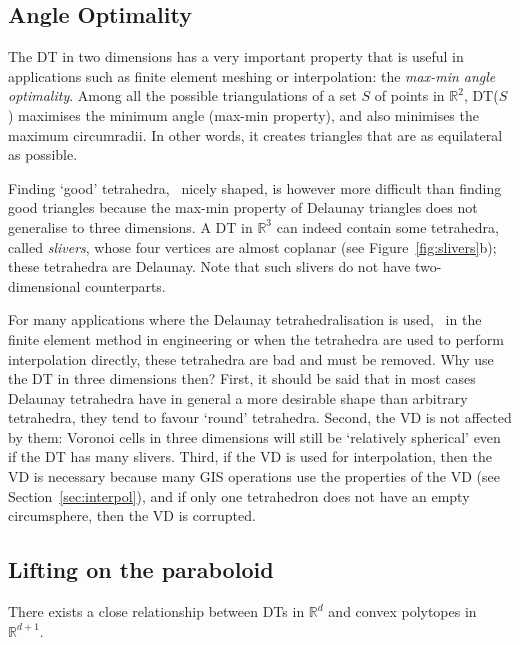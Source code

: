 \subsection{Angle Optimality}
The DT in two dimensions has a very important property that is useful in applications such as finite element meshing or interpolation: the \emph{max-min angle optimality}.
Among all the possible triangulations of a set $S$ of points in $\mathbb{R}^2$, DT($S$) maximises the minimum angle (max-min property), and also minimises the maximum circumradii. 
In other words, it creates triangles that are as equilateral as possible. 

%

Finding `good' tetrahedra, \ie\ nicely shaped, is however more difficult than finding good triangles because the max-min property of Delaunay triangles does not generalise to three dimensions. 
A DT in $\mathbb{R}^3$ can indeed contain some tetrahedra, called \emph{slivers}, 
whose four vertices are almost coplanar (see Figure~\ref{fig:slivers}b); these tetrahedra are Delaunay. 
Note that such slivers do not have two-dimensional counterparts.

%

For many applications where the Delaunay tetrahedralisation is used, \eg\ in the finite element method in engineering or when the tetrahedra are used to perform interpolation directly, these tetrahedra are bad and must be removed. 
Why use the DT in three dimensions then?
First, it should be said that in most cases Delaunay tetrahedra have in general a more desirable shape than arbitrary tetrahedra, they tend to favour `round' tetrahedra. 
Second, the VD is not affected by them: Voronoi cells in three dimensions will still be `relatively spherical' even if the DT has many slivers. 
Third, if the VD is used for interpolation, then the VD is necessary because many GIS operations use the properties of the VD (see Section~\ref{sec:interpol}), and if only one tetrahedron does not have an empty circumsphere, then the VD is corrupted.



\subsection{Lifting on the paraboloid}%
\label{sec:parabolic_lifting}

There exists a close relationship between DTs in $\mathbb{R}^{d}$ and convex polytopes in $\mathbb{R}^{d+1}$. 

